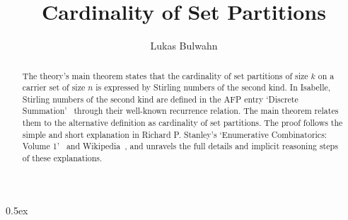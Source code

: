 \documentclass[11pt,a4paper]{article}
\begin{document}
\title{Cardinality of Set Partitions}
\author{Lukas Bulwahn}
\maketitle

\begin{abstract}

The theory's main theorem states that the cardinality of set partitions of
size $k$ on a carrier set of size $n$ is expressed by Stirling numbers of the
second kind.
In Isabelle, Stirling numbers of the second kind are defined in the AFP entry
`Discrete Summation'~\cite{Discrete_Summation-AFP} through their well-known
recurrence relation. The main theorem relates them to the alternative
definition as cardinality of set partitions.
The proof follows the simple and short explanation in Richard P. Stanley's
`Enumerative Combinatorics: Volume 1'~\cite{Stanley-2012} and
Wikipedia~\cite{Wikipedia-Stirling-Numbers-2015}, and unravels the full
details and implicit reasoning steps of these explanations.

\end{abstract}

\tableofcontents

\parindent 0pt\parskip 0.5ex





\end{document}
